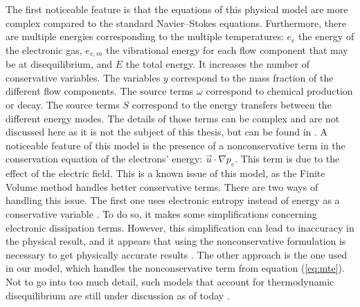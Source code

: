       The first noticeable feature is that the equations of this physical model are more complex compared to the standard Navier--Stokes equations.
      Furthermore, there are multiple energies corresponding to the multiple temperatures: $e_e$ the energy of the electronic gas, $e_{v, m}$ the vibrational energy for each flow component that may be at disequilibrium, and $E$ the total energy.
      It increases the number of conservative variables.
      The variables $y$ correspond to the mass fraction of the different flow components.
      The source terms $\omega$ correspond to chemical production or decay.
      The source terms $S$ correspond to the energy transfers between the different energy modes.
      The details of those terms can be complex and are not discussed here as it is not the subject of this thesis, but can be found in \cite{Soubrie2006}.
      A noticeable feature of this model is the presence of a nonconservative term in the conservation equation of the electrons' energy: $\vec{u} \cdot \nabla p_e$.
      This term is due to the effect of the electric field.
      This is a known issue of this model, as the Finite Volume method handles better conservative terms.
      There are two ways of handling this issue.
      The first one uses electronic entropy instead of energy as a conservative variable \cite{CoquelMarmignon1995}.
      To do so, it makes some simplifications concerning electronic dissipation terms.
      However, this simplification can lead to inaccuracy in the physical result, and it appears that using the nonconservative formulation is necessary to get physically accurate results \cite{Soubrie2006, KimGuelhanBoyd2012}.
      The other approach is the one used in our model, which handles the nonconservative term from equation (\ref{eq:mte}).
      Not to go into too much detail, such models that account for thermodynamic disequilibrium are still under discussion as of today \cite{BlancoJosyula2020}.

